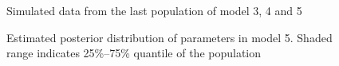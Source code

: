 \begin{figure}
    \begin{center}
    \end{center}

    \caption{Simulated data from the last population of model 3, 4 and 5}
    \label{fig:resultCurve345}

\end{figure}

\begin{figure}[ht]
    \begin{center}
    \end{center}

    \caption[Estimated posterior distribution of parameters in model 5]%
    {Estimated posterior distribution of parameters in model 5. Shaded range indicates 25\%--75\% quantile of the population}
    \label{fig:model5_para}

\end{figure}

